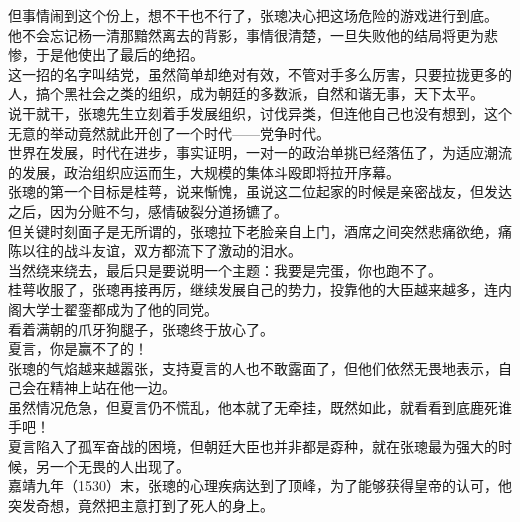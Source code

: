 \begin{multicols}{\theparacolNo}
但事情闹到这个份上，想不干也不行了，张璁决心把这场危险的游戏进行到底。\\

他不会忘记杨一清那黯然离去的背影，事情很清楚，一旦失败他的结局将更为悲惨，于是他使出了最后的绝招。\\

这一招的名字叫结党，虽然简单却绝对有效，不管对手多么厉害，只要拉拢更多的人，搞个黑社会之类的组织，成为朝廷的多数派，自然和谐无事，天下太平。\\

说干就干，张璁先生立刻着手发展组织，讨伐异类，但连他自己也没有想到，这个无意的举动竟然就此开创了一个时代——党争时代。\\

世界在发展，时代在进步，事实证明，一对一的政治单挑已经落伍了，为适应潮流的发展，政治组织应运而生，大规模的集体斗殴即将拉开序幕。\\

张璁的第一个目标是桂萼，说来惭愧，虽说这二位起家的时候是亲密战友，但发达之后，因为分赃不匀，感情破裂分道扬镳了。\\

但关键时刻面子是无所谓的，张璁拉下老脸亲自上门，酒席之间突然悲痛欲绝，痛陈以往的战斗友谊，双方都流下了激动的泪水。\\

当然绕来绕去，最后只是要说明一个主题：我要是完蛋，你也跑不了。\\

桂萼收服了，张璁再接再厉，继续发展自己的势力，投靠他的大臣越来越多，连内阁大学士翟銮都成为了他的同党。\\

看着满朝的爪牙狗腿子，张璁终于放心了。\\

夏言，你是赢不了的！\\

张璁的气焰越来越嚣张，支持夏言的人也不敢露面了，但他们依然无畏地表示，自己会在精神上站在他一边。\\

虽然情况危急，但夏言仍不慌乱，他本就了无牵挂，既然如此，就看看到底鹿死谁手吧！\\

夏言陷入了孤军奋战的困境，但朝廷大臣也并非都是孬种，就在张璁最为强大的时候，另一个无畏的人出现了。\\

嘉靖九年（1530）末，张璁的心理疾病达到了顶峰，为了能够获得皇帝的认可，他突发奇想，竟然把主意打到了死人的身上。\\


\end{multicols}
